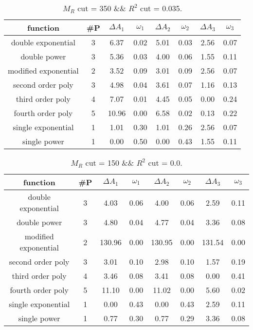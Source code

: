  
\begin{table}[H] 
\begin{center} 
\begin{tabular}{|c|c|cc|cc|cc|} 
\hline function & \#P & $\Delta A_1$ & $\omega_1$ & $\Delta A_2$ & $\omega_2$ & $\Delta A_3$ & $\omega_3$ \\ \hline 
double exponential &  3 &   6.37 &   0.02 &   5.01 &   0.03 &   2.56 &   0.07 \\ 
double power &  3 &   5.36 &   0.03 &   4.00 &   0.06 &   1.55 &   0.11 \\ 
modified exponential &  2 &   3.52 &   0.09 &   3.01 &   0.09 &   2.56 &   0.07 \\ 
second order poly &  3 &   4.98 &   0.04 &   3.61 &   0.07 &   1.16 &   0.13 \\ 
third order poly &  4 &   7.07 &   0.01 &   4.45 &   0.05 &   0.00 &   0.24 \\ 
fourth order poly &  5 &  10.96 &   0.00 &   6.58 &   0.02 &   0.13 &   0.22 \\ 
single exponential &  1 &   1.01 &   0.30 &   1.01 &   0.26 &   2.56 &   0.07 \\ 
single power &  1 &   0.00 &   0.50 &   0.00 &   0.43 &   1.55 &   0.11 \\ 
\hline 
\end{tabular} 
\caption{$M_R$ cut = 350 \&\& $R^2$ cut = 0.035.} 
\label{tab:FitChoices_350_0.035} 
\end{center} 
\end{table} 
 
 
\begin{table}[H] 
\begin{center} 
\begin{tabular}{|c|c|cc|cc|cc|} 
\hline function & \#P & $\Delta A_1$ & $\omega_1$ & $\Delta A_2$ & $\omega_2$ & $\Delta A_3$ & $\omega_3$ \\ \hline 
double exponential &  3 &   4.03 &   0.06 &   4.00 &   0.06 &   2.59 &   0.11 \\ 
double power &  3 &   4.80 &   0.04 &   4.77 &   0.04 &   3.36 &   0.08 \\ 
modified exponential &  2 & 130.96 &   0.00 & 130.95 &   0.00 & 131.54 &   0.00 \\ 
second order poly &  3 &   3.01 &   0.10 &   2.98 &   0.10 &   1.57 &   0.19 \\ 
third order poly &  4 &   3.46 &   0.08 &   3.41 &   0.08 &   0.00 &   0.41 \\ 
fourth order poly &  5 &  11.10 &   0.00 &  11.02 &   0.00 &   5.60 &   0.02 \\ 
single exponential &  1 &   0.00 &   0.43 &   0.00 &   0.43 &   2.59 &   0.11 \\ 
single power &  1 &   0.77 &   0.30 &   0.77 &   0.29 &   3.36 &   0.08 \\ 
\hline 
\end{tabular} 
\caption{$M_R$ cut = 150 \&\& $R^2$ cut = 0.0.} 
\label{tab:FitChoices_150_0.0} 
\end{center} 
\end{table} 
 
